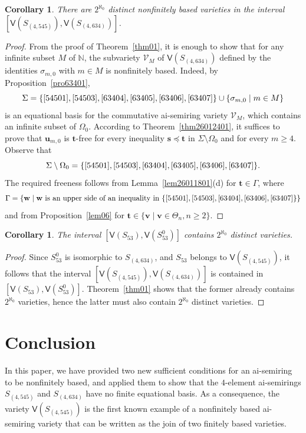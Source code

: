 \documentclass[reqno]{amsart}
\theoremstyle{plain}
\newtheorem{cor}[thm]{Corollary}
\theoremstyle{definition}
\newcommand{\bs}{\mathbf{s}}
\newcommand{\bt}{\mathbf{t}}
\newcommand{\bu}{\mathbf{u}}
\newcommand{\bv}{\mathbf{v}}
\newcommand{\bw}{\mathbf{w}}
\begin{document}
\begin{cor}
There are $2^{\aleph_0}$ distinct nonfinitely based varieties in the interval $[\mathsf{V}(S_{(4, 545)}), \mathsf{V}(S_{(4, 634)})]$.
\end{cor}
\begin{proof}
From the proof of Theorem~\ref{thm01},
it is enough to show that for any infinite subset $M$ of $\mathbb{N}$,
the subvariety $\mathcal{V}_M$ of $\mathsf{V}(S_{(4,634)})$ defined by the identities $\sigma_{m,0}$ with $m \in M$
is nonfinitely based.
Indeed, by Proposition~\ref{pro63401},
\[
\Sigma=\{\eqref{54501}, \eqref{54503}, \eqref{63404}, \eqref{63405}, \eqref{63406}, \eqref{63407}\}
\cup\{\sigma_{m,0} \mid m \in M\}
\]
is an equational basis for the commutative ai-semiring variety $\mathcal{V}_M$, 
which contains an infinite subset of $\Omega_0$.
According to Theorem~\ref{thm26012401}, it suffices to prove that 
$\bu_{m, 0}$ is $\bt$-free for every inequality $\bs \preceq \bt$
in $\Sigma \setminus \Omega_0$ and for every $m\geq 4$. 
Observe that 
\[
\Sigma \setminus \Omega_0=\{\eqref{54501}, \eqref{54503}, \eqref{63404}, \eqref{63405}, \eqref{63406}, \eqref{63407}\}.
\]
The required freeness follows from Lemma~\ref{lem26011801}(d) for $\mathbf{t} \in\Gamma$, where
\[
\Gamma=\{\bw \mid \bw ~\text{is an upper side of an inequality in}~\{\eqref{54501}, \eqref{54503},\eqref{63404},\eqref{63406},\eqref{63407}\}\}
\]
and from Proposition~\ref{lem06} for $\mathbf{t}\in \{\bv \mid \bv\in \Theta_n, n\geq 2\}$.
\end{proof}

\begin{cor}\label{cor02}
The interval $[\mathsf{V}(S_{53}), \mathsf{V}(S_{53}^0)]$ contains $2^{\aleph_0}$ distinct varieties.
\end{cor}
\begin{proof}
Since $S_{53}^0$ is isomorphic to $S_{(4, 634)}$, and $S_{53}$ belongs to $\mathsf{V}(S_{(4, 545)})$,
it follows that
the interval $[\mathsf{V}(S_{(4, 545)}), \mathsf{V}(S_{(4, 634)})]$
is contained in $[\mathsf{V}(S_{53}), \mathsf{V}(S_{53}^0)]$.
Theorem~\ref{thm01} shows that the former already contains \(2^{\aleph_0}\) varieties,
hence the latter must also contain \(2^{\aleph_0}\) distinct varieties.
\end{proof}

\section{Conclusion}
In this paper, we have provided two new sufficient conditions for an ai-semiring to be nonfinitely based,
and applied them to show that the $4$-element ai-semirings $S_{(4, 545)}$ and $S_{(4, 634)}$ have no finite equational basis.
As a consequence, the variety $\mathsf{V}(S_{(4, 545)})$ is the first known example of a nonfinitely based ai-semiring variety
that can be written as the join of two finitely based varieties.
\end{document}
